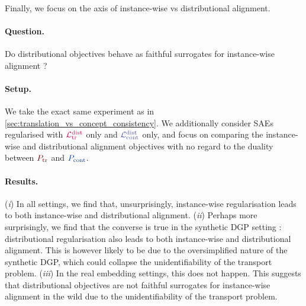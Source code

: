 \documentclass{article}
\begin{document}
\paragraph{}Finally, we focus on the axis of instance-wise vs distributional alignment.
\paragraph{Question.} Do distributional objectives behave as faithful surrogates for instance-wise alignment ?
\paragraph{Setup.} We take the exact same experiment as in \cref{sec:translation_vs_concept_consistency}. We additionally consider SAEs regularised with $\Ltrdist$ only and $\Lcontdist$ only, and focus on comparing the instance-wise and distributional alignment objectives with no regard to the duality between $\Ptr$ and $\Pcont$.
\paragraph{Results.}
(\emph{i}) In all settings, we find that, unsurprisingly, instance-wise regularisation leads to both instance-wise and distributional alignment. 
%
(\emph{ii}) Perhaps more surprisingly, we find that the converse is true in the synthetic DGP setting : distributional regularisation also leads to both instance-wise and distributional alignment. This is however likely to be due to the oversimplified nature of the synthetic DGP, which could collapse the unidentifiability of the transport problem.
%
(\emph{iii}) In the real embedding settings, this does not happen. This suggests that distributional objectives are not faithful surrogates for instance-wise alignment in the wild due to the unidentifiability of the transport problem.

\begin{table}[h]
  \centering
  \caption{\textbf{Distributional objectives alone are not faithful surrogates for instance-wise alignment}. SAE quality on \textbf{real embeddings} under different regularisation regimes.}
  \label{tab:instance_vs_distribution_alignment_real}
\end{table}
\end{document}
